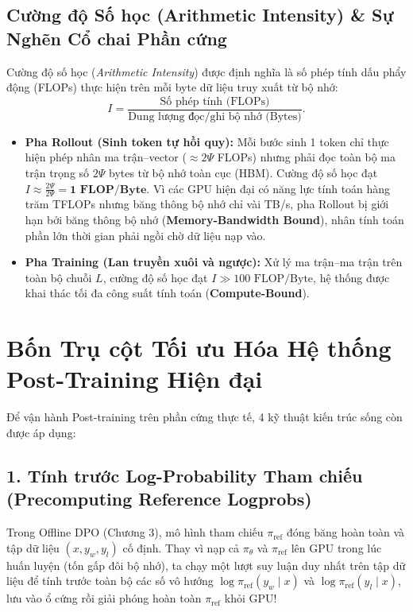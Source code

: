 \subsection{Cường độ Số học (Arithmetic Intensity) \& Sự Nghẽn Cổ chai Phần cứng}
Cường độ số học (\textit{Arithmetic Intensity}) được định nghĩa là số phép tính dấu phẩy động (FLOPs) thực hiện trên mỗi byte dữ liệu truy xuất từ bộ nhớ:
\begin{equation}
    I = \frac{\text{Số phép tính (FLOPs)}}{\text{Dung lượng đọc/ghi bộ nhớ (Bytes)}}.
\end{equation}
\begin{itemize}[leftmargin=1.2cm]
    \item \textbf{Pha Rollout (Sinh token tự hồi quy):} Mỗi bước sinh 1 token chỉ thực hiện phép nhân ma trận--vector ($\approx 2\Psi$ FLOPs) nhưng phải đọc toàn bộ ma trận trọng số $2\Psi$ bytes từ bộ nhớ toàn cục (HBM). Cường độ số học đạt $I \approx \frac{2\Psi}{2\Psi} = \mathbf{1\text{ FLOP/Byte}}$. Vì các GPU hiện đại có năng lực tính toán hàng trăm TFLOPs nhưng băng thông bộ nhớ chỉ vài TB/s, pha Rollout bị giới hạn bởi băng thông bộ nhớ (\textbf{Memory-Bandwidth Bound}), nhân tính toán phần lớn thời gian phải ngồi chờ dữ liệu nạp vào.
    \item \textbf{Pha Training (Lan truyền xuôi và ngược):} Xử lý ma trận--ma trận trên toàn bộ chuỗi $L$, cường độ số học đạt $I \gg 100\text{ FLOP/Byte}$, hệ thống được khai thác tối đa công suất tính toán (\textbf{Compute-Bound}).
\end{itemize}

\section{Bốn Trụ cột Tối ưu Hóa Hệ thống Post-Training Hiện đại}
\label{sec:system_optimizations}

Để vận hành Post-training trên phần cứng thực tế, 4 kỹ thuật kiến trúc sống còn được áp dụng:

\subsection{1. Tính trước Log-Probability Tham chiếu (Precomputing Reference Logprobs)}
Trong Offline DPO (Chương 3), mô hình tham chiếu $\pi_{\text{ref}}$ đóng băng hoàn toàn và tập dữ liệu $(x, y_w, y_l)$ cố định. Thay vì nạp cả $\pi_\theta$ và $\pi_{\text{ref}}$ lên GPU trong lúc huấn luyện (tốn gấp đôi bộ nhớ), ta chạy một lượt suy luận duy nhất trên tập dữ liệu để tính trước toàn bộ các số vô hướng $\log \pi_{\text{ref}}(y_w \mid x)$ và $\log \pi_{\text{ref}}(y_l \mid x)$, lưu vào ổ cứng rồi giải phóng hoàn toàn $\pi_{\text{ref}}$ khỏi GPU!

